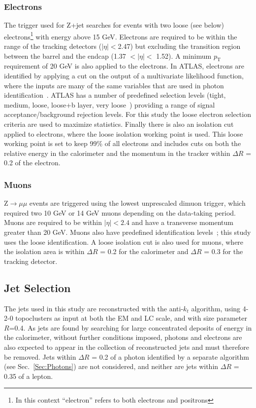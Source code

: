 \subsubsection{Electrons}
The trigger used for Z+jet searches for events with two loose (see below) electrons\footnote{In this context ``electron'' refers to both electrons and positrons} with energy above 15 GeV.  
Electrons are required to be within the range of the tracking detectors ($\mid\eta\mid<$2.47) but excluding the transition region between the barrel and the endcap (1.37 $<\mid\eta\mid<$ 1.52).  
A minimum $p_{\mathrm T}$ requirement of 20 GeV is also applied to the electrons.  
In ATLAS, electrons are identified by applying a cut on the output of a multivariate likelihood function, where the inputs are many of the same variables that are used in photon identification~\cite{ATL-PHYS-PUB-2015-041}.  
ATLAS has a number of predefined selection levels (tight, medium, loose, loose+b layer, very loose~\cite{ATL-PHYS-PUB-2015-041}) providing a range of signal acceptance/background rejection levels.  
For this study the loose electron selection criteria are used to maximize statistics.  
Finally there is also an isolation cut applied to electrons, where the loose isolation working point is used.  
This loose working point is set to keep 99\% of all electrons and includes cuts on both the relative energy in the calorimeter and the momentum in the tracker within $\Delta R$ = 0.2 of the electron.  


\subsubsection{Muons}
Z$\rightarrow\mu\mu$ events are triggered using the lowest unprescaled dimuon trigger, which required two 10 GeV or 14 GeV muons depending on the data-taking period.   
Muons are required to be within ${\mid\eta\mid<2.4}$ and have a transverse momentum greater than 20 GeV.  
Muons also have predefined identification levels~\cite{ATL-PHYS-PUB-2015-037}; this study uses the loose identification.  
A loose isolation cut is also used for muons, where the isolation area is within $\Delta R$ = 0.2 for the calorimeter and $\Delta R$ = 0.3 for the tracking detector.  

\subsection{Jet Selection}
The jets used in this study are reconstructed with the anti-$k_t$ algorithm, using 4-2-0 topoclusters as input at both the EM and LC scale, and with size parameter $R$=0.4.  
As jets are found by searching for large concentrated deposits of energy in the calorimeter, without further conditions imposed, photons and electrons are also expected to appear in the collection of reconstructed jets and must therefore be removed.  
Jets within $\Delta R$ = 0.2 of a photon identified by a separate algorithm (see Sec.~\ref{Sec:Photons}) are not considered, and neither are jets within $\Delta R$ = 0.35 of a lepton.  

